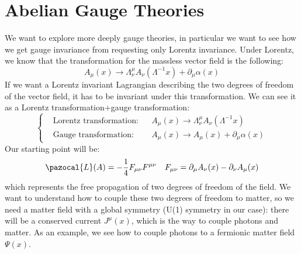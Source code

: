 \documentclass[../main.tex]{subfiles}
\begin{document}
\section{Abelian Gauge Theories}
We want to explore more deeply gauge theories, in particular we want to see how we get gauge invariance from requesting only Lorentz invariance. Under Lorentz, we know that the transformation for the massless vector field is the following:
\[
A_\mu(x)\to\Lambda^\mu_\nu A_\nu(\Lambda^{-1}x)+\partial_\mu\alpha(x)
\]
If we want a Lorentz invariant Lagrangian describing the two degrees of freedom of the vector field, it has to be invariant under this transformation. We can see it as a Lorentz transformation+gauge transformation:
\[
\left\{
\begin{aligned}
&\text{Lorentz transformation:} &&A_\mu(x)\to\Lambda^\mu_\nu A_\nu(\Lambda^{-1}x)\\
&\text{Gauge transformation:} &&A_\mu(x)\to A_\mu(x)+\partial_\mu\alpha(x)
\end{aligned}
\right.
\]
Our starting point will be:
\[
\pazocal{L}(A)=-\frac{1}{4}F_{\mu\nu}F^{\mu\nu} \quad F_{\mu\nu}=\partial_\mu A_\nu(x)-\partial_\nu A_\mu(x)
\]
which represents the free propagation of two degrees of freedom of the field. We want to understand how to couple these two degrees of freedom to matter, so we need a matter field with a global symmetry (U(1) symmetry in our case): there will be a conserved current $J^\mu(x)$, which is the way to couple photons and matter. As an example, we see how to couple photons to a fermionic matter field $\Psi(x)$.
\end{document}
